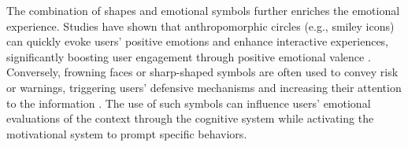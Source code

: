 The combination of shapes and emotional symbols further enriches the emotional experience. Studies have shown that anthropomorphic circles (e.g., smiley icons) can quickly evoke users’ positive emotions and enhance interactive experiences, significantly boosting user engagement through positive emotional valence \cite{mayer2014benefits}. Conversely, frowning faces or sharp-shaped symbols are often used to convey risk or warnings, triggering users’ defensive mechanisms and increasing their attention to the information \cite{ferrara2015measuring}. The use of such symbols can influence users’ emotional evaluations of the context through the cognitive system while activating the motivational system to prompt specific behaviors.


